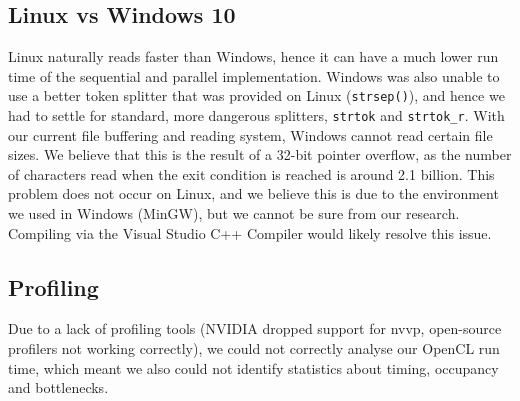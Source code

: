 \subsection{Linux vs Windows 10}
Linux naturally reads faster than Windows, hence it can have a much lower run time of the sequential and parallel implementation. Windows was also unable to use a better token splitter that was provided on Linux (\texttt{strsep()}), and hence we had to settle for standard, more dangerous splitters, \texttt{strtok} and \texttt{strtok\_r}. With our current file buffering and reading system, Windows cannot read certain file sizes. We believe that this is the result of a 32-bit pointer overflow, as the number of characters read when the exit condition is reached is around 2.1 billion. This problem does not occur on Linux, and we believe this is due to the environment we used in Windows (MinGW), but we cannot be sure from our research. Compiling via the Visual Studio C++ Compiler would likely resolve this issue.

\subsection{Profiling}
Due to a lack of profiling tools (NVIDIA dropped support for nvvp, open-source profilers not working correctly), we could not correctly analyse our OpenCL run time, which meant we also could not identify statistics about timing, occupancy and bottlenecks.
